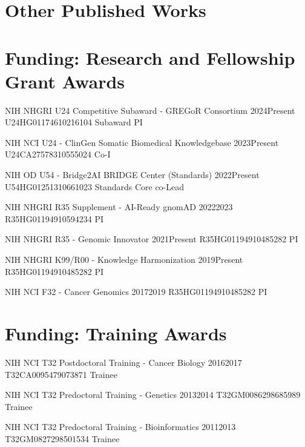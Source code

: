 \documentclass[10pt]{article} %
\begin{document}
\section{Other Published Works}

\begin{enumerate}



\end{enumerate}


\section{Funding: Research and Fellowship Grant Awards}

\nihFund
{NIH NHGRI U24 Competitive Subaward - GREGoR Consortium}
{2024}{Present}
{U24HG011746}{10216104}
{Subaward PI}

\nihFund
{NIH NCI U24 - ClinGen Somatic Biomedical Knowledgebase}
{2023}{Present}
{U24CA275783}{10555024}
{Co-I}

\nihFund
{NIH OD U54 - Bridge2AI BRIDGE Center (Standards)}
{2022}{Present}
{U54HG012513}{10661023}
{Standards Core co-Lead}

\nihFund
{NIH NHGRI R35 Supplement - AI-Ready gnomAD}
{2022}{2023}
{R35HG011949}{10594234}
{PI}

\nihFund
{NIH NHGRI R35 - Genomic Innovator}
{2021}{Present}
{R35HG011949}{10485282}
{PI}

\nihFund
{NIH NHGRI K99/R00 - Knowledge Harmonization}
{2019}{Present}
{R35HG011949}{10485282}
{PI}

\nihFund
{NIH NCI F32 - Cancer Genomics}
{2017}{2019}
{R35HG011949}{10485282}
{PI}

\section{Funding: Training Awards}

\nihFund
{NIH NCI T32 Postdoctoral Training - Cancer Biology}
{2016}{2017}
{T32CA009547}{9073871}
{Trainee}

\nihFund
{NIH NCI T32 Predoctoral Training - Genetics}
{2013}{2014}
{T32GM008629}{8685989}
{Trainee}

\nihFund
{NIH NCI T32 Predoctoral Training - Bioinformatics}
{2011}{2013}
{T32GM082729}{8501534}
{Trainee}
\end{document}
